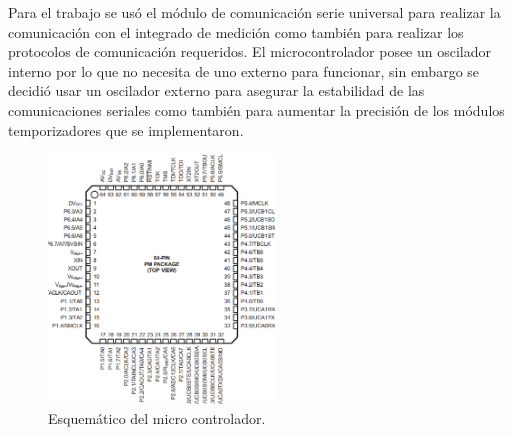 Para el trabajo se usó el módulo de comunicación serie universal para realizar la comunicación con el integrado de medición como también para realizar los protocolos de comunicación requeridos. El microcontrolador posee un oscilador interno por lo que no necesita de uno externo para funcionar, sin embargo se decidió usar un oscilador externo para asegurar la estabilidad de las comunicaciones seriales como también para aumentar la precisión de los módulos temporizadores que se implementaron.

\begin{figure}[!h]
	\centering
	\includegraphics[width=60mm,keepaspectratio]{Figures/microdatasheet1.png}
	\caption{Esquemático del micro controlador.}
	\label{fig:msp430squematic}
\end{figure}






